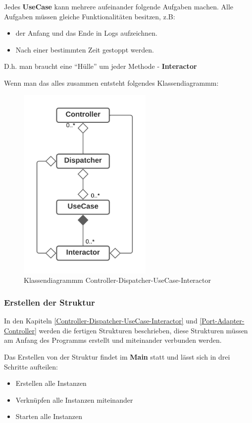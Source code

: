 \documentclass{article}
\begin{document}
    Jedes \textbf{UseCase} kann mehrere aufeinander folgende Aufgaben machen.
    Alle Aufgaben müssen gleiche Funktionalitäten besitzen, z.B:
    \begin{itemize}
        \item der Anfang und das Ende in Logs aufzeichnen.
        \item Nach einer bestimmten Zeit gestoppt werden.
    \end{itemize}
    D.h. man braucht eine ``Hülle'' um jeder Methode - \textbf{Interactor}

    Wenn man das alles zusammen entsteht folgendes Klassendiagrammm:

    \begin{figure}[H]
        \centering
        \includegraphics[width=6.5cm]{./images/Controller-Dispatcher-UseCase-Interactor.png}
         \caption[Klassendiagrammm Controller-Dispatcher-UseCase-Interactor]{Klassendiagrammm Controller-Dispatcher-UseCase-Interactor \footnotemark}
         \label{fig:CDCDUI}
    \end{figure}

    \newpage
    \subsubsection{Erstellen der Struktur}
    In den Kapiteln \ref{Controller-Dispatcher-UseCase-Interactor} und \ref{Port-Adapter-Controller} 
    werden die fertigen Strukturen beschrieben, diese Strukturen müssen am Anfang des Programms erstellt
    und miteinander verbunden werden.

    Das Erstellen von der Struktur findet im \textbf{Main} statt und lässt sich in drei Schritte aufteilen:
    \begin{itemize}
        \item Erstellen alle Instanzen
        \item Verknüpfen alle Instanzen miteinander
        \item Starten alle Instanzen
    \end{itemize}
\end{document}
